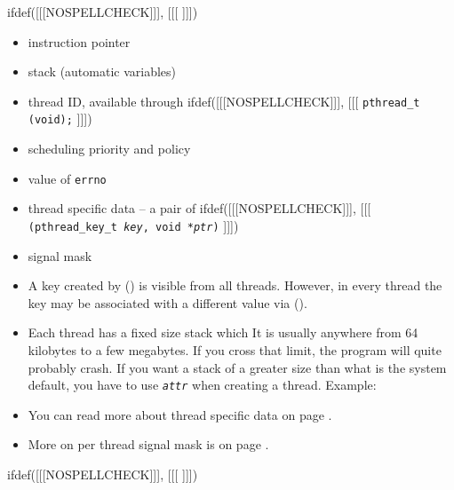 
ifdef([[[NOSPELLCHECK]]], [[[
\label{THREAD_ATTRS}
]]])

\begin{slide}
\begin{itemize}
\item instruction pointer
\item stack (automatic variables)
\item thread ID, available through
ifdef([[[NOSPELLCHECK]]], [[[
\texttt{pthread\_t (void);}
]]])
\item scheduling priority and policy
\item value of \texttt{errno}
\item thread specific data -- a pair of
ifdef([[[NOSPELLCHECK]]], [[[
\texttt{(pthread\_key\_t \emph{key}, void *\emph{ptr})}
]]])
\item signal mask
\end{itemize}
\end{slide}

\begin{itemize}
\item A key created by () is visible from all
threads. However, in every thread the key may be associated with a different
value via ().
\item Each thread has a fixed size stack which   It is usually anywhere from 64 kilobytes to a few megabytes.  If you
cross that limit, the program will quite probably crash.  If you want a stack of
a greater size than what is the system default, you have to use
\emph{\texttt{attr}} when creating a thread.
Example: 
\item You can read more about thread specific data on page
\pageref{THREAD_SPECIFIC_DATA}.
\item More on per thread signal mask is on page \pageref{PTHREADSIGMASK}.
\end{itemize}


ifdef([[[NOSPELLCHECK]]], [[[
]]])

